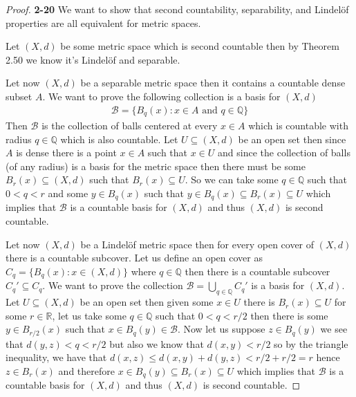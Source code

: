 \documentclass[11pt]{article}
\newcommand{\Q}{\mathbb{Q}}
\newcommand{\R}{\mathbb{R}}
\theoremstyle{definition}
\begin{document}
\begin{proof}{\textbf{2-20}}
    We want to show that second countability, separability, and Lindelöf
    properties are all equivalent for metric spaces.

    Let $(X,d)$ be some metric space which is second countable then by Theorem
    2.50 we know it's Lindelöf and separable.

    Let now $(X,d)$ be a separable metric space then it contains
    a countable dense subset $A$.
    We want to prove the following collection is a basis for $(X,d)$
    \begin{align*}
        \mathcal{B} = \{B_{q}(x): x \in A \text{ and }q \in \Q\}
    \end{align*}
    Then $\mathcal{B}$ is the collection of balls centered at every $x \in A$
    which is countable with radius $q \in \Q$ which is also countable.
    Let $U \subseteq (X,d)$ be an open set then since $A$ is dense there is
    a point $x \in A$ such that $x \in U$ and since the collection of balls
    (of any radius) is a basis for the metric space then there must be some
    $B_{r}(x) \subseteq (X,d)$ such that $B_{r}(x) \subseteq U$.
    So we can take some $q \in \Q$ such that $0 < q < r$ and some
    $y \in B_q(x)$ such that
    $y \in B_{q}(x) \subseteq B_{r}(x) \subseteq U$
    which implies that $\mathcal{B}$ is a countable basis for $(X,d)$
    and thus $(X,d)$ is second countable.

    Let now $(X,d)$ be a Lindelöf metric space then for every open cover of
    $(X,d)$ there is a countable subcover.
    Let us define an open cover as $C_q = \{B_q(x): x \in (X,d)\}$
    where $q \in \Q$ then there is 
    a countable subcover $C_q' \subseteq C_q$. We want to prove the collection
    $\mathcal{B} = \bigcup_{q \in \Q} C_q'$ is a basis for $(X,d)$.
    Let $U \subseteq (X,d)$ be an open set then given some $x \in U$ there
    is $B_{r}(x) \subseteq U$ for some $r \in \R$, let us take some $q \in \Q$
    such that $0 < q < r/2$ then there is some $y \in B_{r/2}(x)$ such that
    $x \in B_q(y) \in \mathcal{B}$. Now let us suppose $z \in B_q(y)$
    we see that $d(y,z) < q < r/2$ but also we know that $d(x,y) < r/2$
    so by the triangle inequality, we have that
    $d(x,z) \leq d(x,y) + d(y,z) < r/2 + r/2 = r$ hence $z \in B_r(x)$ and
    therefore $x \in B_q(y) \subseteq B_r(x) \subseteq U$ which implies that
    $\mathcal{B}$ is a countable basis for $(X,d)$ and thus $(X,d)$
    is second countable. 
\end{proof}
\cleardoublepage
\end{document}
